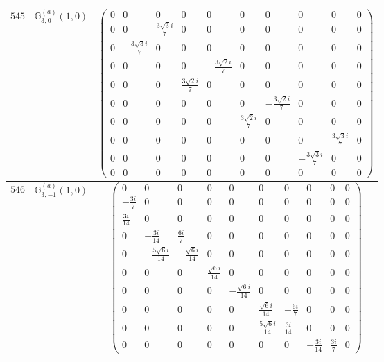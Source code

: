 \documentclass[fleqn,8pt,landscape]{jsarticle}
\begin{document}
\begin{center}
\begin{longtable}{ccc}
$ 545 $ & $ \mathbb{G}_{3,0}^{(a)}(1,0) $ & $ \begin{pmatrix} 0 & 0 & 0 & 0 & 0 & 0 & 0 & 0 & 0 & 0 \\ 0 & 0 & \frac{3 \sqrt{3} i}{7} & 0 & 0 & 0 & 0 & 0 & 0 & 0 \\ 0 & - \frac{3 \sqrt{3} i}{7} & 0 & 0 & 0 & 0 & 0 & 0 & 0 & 0 \\ 0 & 0 & 0 & 0 & - \frac{3 \sqrt{2} i}{7} & 0 & 0 & 0 & 0 & 0 \\ 0 & 0 & 0 & \frac{3 \sqrt{2} i}{7} & 0 & 0 & 0 & 0 & 0 & 0 \\ 0 & 0 & 0 & 0 & 0 & 0 & - \frac{3 \sqrt{2} i}{7} & 0 & 0 & 0 \\ 0 & 0 & 0 & 0 & 0 & \frac{3 \sqrt{2} i}{7} & 0 & 0 & 0 & 0 \\ 0 & 0 & 0 & 0 & 0 & 0 & 0 & 0 & \frac{3 \sqrt{3} i}{7} & 0 \\ 0 & 0 & 0 & 0 & 0 & 0 & 0 & - \frac{3 \sqrt{3} i}{7} & 0 & 0 \\ 0 & 0 & 0 & 0 & 0 & 0 & 0 & 0 & 0 & 0 \end{pmatrix} $ \\ \hline
$ 546 $ & $ \mathbb{G}_{3,-1}^{(a)}(1,0) $ & $ \begin{pmatrix} 0 & 0 & 0 & 0 & 0 & 0 & 0 & 0 & 0 & 0 \\ - \frac{3 i}{7} & 0 & 0 & 0 & 0 & 0 & 0 & 0 & 0 & 0 \\ \frac{3 i}{14} & 0 & 0 & 0 & 0 & 0 & 0 & 0 & 0 & 0 \\ 0 & - \frac{3 i}{14} & \frac{6 i}{7} & 0 & 0 & 0 & 0 & 0 & 0 & 0 \\ 0 & - \frac{5 \sqrt{6} i}{14} & - \frac{\sqrt{6} i}{14} & 0 & 0 & 0 & 0 & 0 & 0 & 0 \\ 0 & 0 & 0 & \frac{\sqrt{6} i}{14} & 0 & 0 & 0 & 0 & 0 & 0 \\ 0 & 0 & 0 & 0 & - \frac{\sqrt{6} i}{14} & 0 & 0 & 0 & 0 & 0 \\ 0 & 0 & 0 & 0 & 0 & \frac{\sqrt{6} i}{14} & - \frac{6 i}{7} & 0 & 0 & 0 \\ 0 & 0 & 0 & 0 & 0 & \frac{5 \sqrt{6} i}{14} & \frac{3 i}{14} & 0 & 0 & 0 \\ 0 & 0 & 0 & 0 & 0 & 0 & 0 & - \frac{3 i}{14} & \frac{3 i}{7} & 0 \end{pmatrix} $ \\ \hline

\end{longtable}
\end{center}
\end{document}

